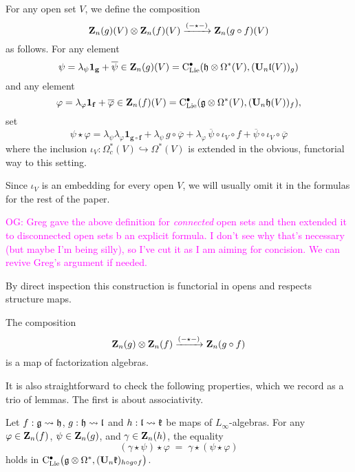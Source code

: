 \documentclass[11pt]{amsart}
\numberwithin{equation}{section}
\def\owen{\textcolor{magenta}{OG: }\textcolor{magenta}}
\begin{document}
\begin{dfn}
\label{def:comp}
For any open set $V$, we define the composition 
\[
\mathbf Z_n(g)(V) \otimes \mathbf Z_n(f)(V) \xrightarrow{(-\star-)} \mathbf Z_n(g \circ f)(V)
\]
as follows.
For any element
\[
\psi=\lambda_\psi {\bf 1_g} +\overline{\psi} \in \mathbf Z_n(g)(V) = {\rm C}_{\rm Lie}^\bullet(\mathfrak h \otimes \Omega^*(V), (\mathbf U_n \mathfrak l (V))_g  )
\]
and any element
\[
\varphi =\lambda_\varphi {\bf 1_f} +\overline{\varphi}\in \mathbf Z_n(f)(V) = {\rm C}_{\rm Lie}^\bullet(\mathfrak g \otimes \Omega^*(V), (\mathbf U_n \mathfrak h (V))_f  ),
\] 
set
\[
\psi \star \varphi =  
\lambda_{\psi} \lambda_{\varphi} \mathbf{1_{g\circ f}}
+ \lambda_\psi \,g \circ \overline{\varphi} 
+ \lambda_{\varphi}\, \overline{\psi} \circ \iota_V \circ f 
+\overline{\psi} \circ \iota_V \circ \overline{\varphi} 
\]
where the inclusion $\iota_V: \Omega^*_c(V) \hookrightarrow \Omega^*(V)$ is extended in the obvious, functorial way to this setting.
\end{dfn}

Since $\iota_V$ is an embedding for every open $V$, 
we will usually omit it in the formulas for the rest of the paper.

\owen{Greg gave the above definition for {\em connected} open sets and then extended it to disconnected open sets b an explicit formula. 
I don't see why that's necessary (but maybe I'm being silly), so I've cut it as I am aiming for concision.
We can revive Greg's argument if needed.}

By direct inspection this construction is functorial in opens and respects structure maps.

\begin{lmm}
\label{L:compisfacmap} 
The composition 
\[
 \mathbf Z_n(g) \otimes  \mathbf Z_n(f) \xrightarrow{(-\star-)}  \mathbf Z_n(g \circ f)
\]
 is a map of factorization algebras.
\end{lmm}

It is also straightforward to check the following properties,
which we record as a trio of lemmas.
The first is about associativity.

\begin{lmm}
\label{L:compisassociative} 
Let $f: \mathfrak g \rightsquigarrow \mathfrak h$, $g: \mathfrak h \rightsquigarrow \mathfrak l$ and $h: \mathfrak l \rightsquigarrow \mathfrak{k}$ be maps of $L_\infty$-algebras.
For any $\varphi \in \mathbf Z_n(f)$, $\psi \in \mathbf Z_n(g)$, and $\gamma \in \mathbf Z_n(h)$,  
the equality 
\[ 
(\gamma\star \psi)\star \varphi \;=\; \gamma\star (\psi \star \varphi)  
\]
holds in ${\rm C}_{\rm Lie}^\bullet\big(\mathfrak g\otimes \Omega^*, (\mathbf U_n \mathfrak{k})_{h \circ g \circ f} \big)$.
\end{lmm}
\end{document}
